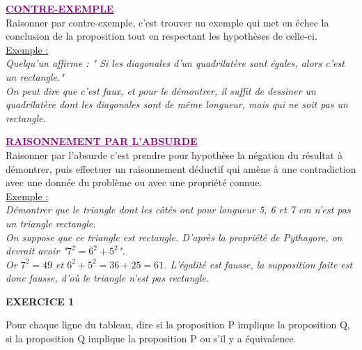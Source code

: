 \documentclass[a4paper,11pt]{article}
\begin{document}
\textbf{\textcolor{purple}{\underline{CONTRE-EXEMPLE}}}\\
Raisonner par contre-exemple, c'est trouver un exemple qui met en échec la conclusion de la proposition tout en respectant les hypothèses de celle-ci.\\

\underline{Exemple :}\\
\textit{Quelqu'un affirme : " Si les diagonales d’un quadrilatère sont égales, alors c'est un rectangle."\\
On peut dire que c'est faux, et pour le démontrer, il suffit de dessiner un quadrilatère dont les diagonales sont de même longueur, mais qui ne soit pas un rectangle.}\\


\vspace*{0.5cm}

\textbf{\textcolor{purple}{\underline{RAISONNEMENT PAR L'ABSURDE}}}\\
Raisonner par l'absurde c'est prendre pour hypothèse la négation du résultat à démontrer, puis effectuer un raisonnement déductif qui amène à une contradiction avec une donnée du problème ou avec une propriété
connue.\\

\underline{Exemple :}\\
\textit{Démontrer que le triangle dont les côtés ont pour longueur 5, 6 et 7 cm n’est pas un triangle rectangle.}\\

\textit{On suppose que ce triangle est rectangle. D'après la propriété de Pythagore, on devrait avoir "$7^{2} = 6^{2} + 5^{2}$".\\
Or $7^{2}=49$ et $6^{2} + 5^{2}= 36+ 25 = 61$. L'égalité est fausse, la supposition faite est donc fausse, d'où le triangle n'est pas rectangle.
} \\


\newpage


\vspace*{0.5cm}

\begin{large}
\textbf{EXERCICE 1}\\
\end{large}
Pour chaque ligne du tableau, dire si la proposition P implique la proposition Q, si la proposition Q implique la proposition P ou s'il y a équivalence.\\

\renewcommand{\arraystretch}{2}
\end{document}
